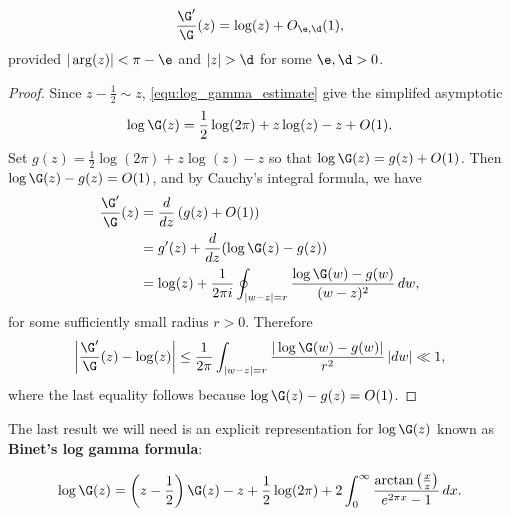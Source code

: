       \begin{proposition}\label{equ:approximtion_for_digamma}
      \[
        \frac{\G'}{\G}(z) = \log(z)+O_{\e,\d}(1),
      \]
      provided $|\arg(z)| < \pi-\e$ and $|z| > \d$ for some $\e,\d > 0$.
      \end{proposition}
      \begin{proof}
        Since $z-\frac{1}{2} \sim z$, \cref{equ:log_gamma_estimate} give the simplifed asymptotic
        \[
          \log\G(z) = \frac{1}{2}\log(2\pi)+z\log(z)-z+O(1).
        \]
        Set $g(z) = \frac{1}{2}\log(2\pi)+z\log(z)-z$ so that $\log\G(z) = g(z)+O(1)$. Then $\log\G(z)-g(z) = O(1)$, and by Cauchy's integral formula, we have
        \begin{align*}
          \frac{\G'}{\G}(z) &= \frac{d}{dz}\left(g(z)+O(1)\right) \\
          &= g'(z)+\frac{d}{dz}(\log\G(z)-g(z)) \\
          &= \log(z)+\frac{1}{2\pi i}\oint_{|w-z| = r}\frac{\log\G(w)-g(w)}{(w-z)^{2}}\,dw,
        \end{align*}
        for some sufficiently small radius $r > 0$. Therefore
        \[
          \left|\frac{\G'}{\G}(z)-\log(z)\right| \le \frac{1}{2\pi}\int_{|w-z| = r}\frac{|\log\G(w)-g(w)|}{r^{2}}\,|dw| \ll 1,
        \]
        where the last equality follows because $\log\G(z)-g(z) = O(1)$.
      \end{proof}

      The last result we will need is an explicit representation for $\log\G(z)$ known as \textbf{Binet's log gamma formula}:

      \begin{proposition}
        \phantom{ }
        \[
          \log\G(z) = \left(z-\frac{1}{2}\right)\G(z)-z+\frac{1}{2}\log(2\pi)+2\int_{0}^{\infty}\frac{\arctan\left(\frac{x}{z}\right)}{e^{2\pi x}-1}\,dx.
        \]
      \end{proposition}